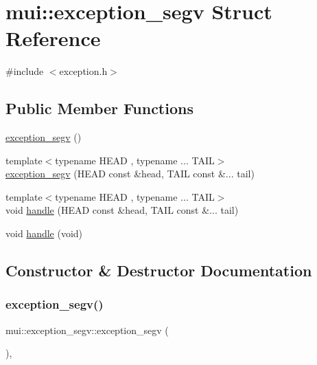 \hypertarget{structmui_1_1exception__segv}{}\section{mui\+:\+:exception\+\_\+segv Struct Reference}
\label{structmui_1_1exception__segv}


{\ttfamily \#include $<$exception.\+h$>$}

\subsection*{Public Member Functions}
\begin{DoxyCompactItemize}
\item 
\hyperlink{structmui_1_1exception__segv_abd398976a6fcd156262e033c274b72b4}{exception\+\_\+segv} ()
\item 
{\footnotesize template$<$typename H\+E\+AD , typename ... T\+A\+IL$>$ }\\\hyperlink{structmui_1_1exception__segv_aecea0ce4316060d83687d8b7c053dfd3}{exception\+\_\+segv} (H\+E\+AD const \&head, T\+A\+IL const \&... tail)
\item 
{\footnotesize template$<$typename H\+E\+AD , typename ... T\+A\+IL$>$ }\\void \hyperlink{structmui_1_1exception__segv_a2a0e173d21952400fa3aab0ec418338c}{handle} (H\+E\+AD const \&head, T\+A\+IL const \&... tail)
\item 
void \hyperlink{structmui_1_1exception__segv_a9a4e64bfd3ff46807c92706be20ce3fa}{handle} (void)
\end{DoxyCompactItemize}


\subsection{Constructor \& Destructor Documentation}
\mbox{\label{structmui_1_1exception__segv_abd398976a6fcd156262e033c274b72b4}} 
\subsubsection{\texorpdfstring{exception\+\_\+segv()}{exception\_segv()}\hspace{0.1cm}{\footnotesize\ttfamily [1/2]}}
{\footnotesize\ttfamily mui\+::exception\+\_\+segv\+::exception\+\_\+segv (\begin{DoxyParamCaption}{ }\end{DoxyParamCaption})\hspace{0.3cm}{\ttfamily [inline]}, {\ttfamily [explicit]}}


